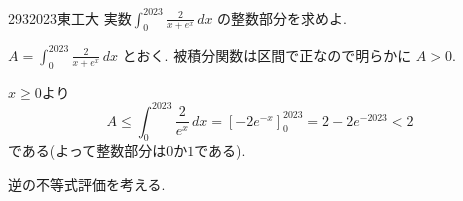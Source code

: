 \begin{prob}{293}{}{2023東工大}
実数$\displaystyle\int_{0}^{2023}\frac{2}{x+e^x}\, dx$ の整数部分を求めよ.
\end{prob}

$A = \int_{0}^{2023} \frac{2}{x+e^x}\, dx$ とおく. 被積分関数は区間で正なので明らかに $A>0$.

$x \geq 0$より
\[
A \leq \int_{0}^{2023} \frac{2}{e^x} \, dx = [-2e^{-x}]_{0}^{2023} = 2 - 2e^{-2023} < 2
\]
である(よって整数部分は$0$か$1$である).

逆の不等式評価を考える.
